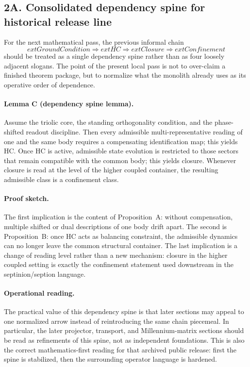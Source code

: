 \documentclass[12pt,a4paper]{article}
\DeclareRobustCommand{\QSCver}[1]{archival stage}
\renewcommand{\QSCver}[1]{historical release line}
\begin{document}
\subsection*{2A. Consolidated dependency spine for \QSCver{v2.27.0}}
For the next mathematical pass, the previous informal chain
\[
	ext{Ground Condition} \Longrightarrow ext{HC} \Longrightarrow ext{Closure} \Longrightarrow ext{Confinement}
\]
should be treated as a single dependency spine rather than as four loosely
adjacent slogans. The point of the present local pass is not to over-claim a
finished theorem package, but to normalize what the monolith already uses as
its operative order of dependence.

\paragraph{Lemma C (dependency spine lemma).}
Assume the triolic core, the standing orthogonality condition, and the
phase-shifted readout discipline. Then every admissible multi-representative
reading of one and the same body requires a compensating identification map;
this yields HC. Once HC is active, admissible state evolution is restricted to
those sectors that remain compatible with the common body; this yields closure.
Whenever closure is read at the level of the higher coupled container, the
resulting admissible class is a confinement class.

\paragraph{Proof sketch.}
The first implication is the content of Proposition~A: without compensation,
multiple shifted or dual descriptions of one body drift apart. The second is
Proposition~B: once HC acts as balancing constraint, the admissible dynamics can
no longer leave the common structural container. The last implication is a
change of reading level rather than a new mechanism: closure in the higher
coupled setting is exactly the confinement statement used downstream in the
septinion/seption language.

\paragraph{Operational reading.}
The practical value of this dependency spine is that later sections may appeal
to one normalized arrow instead of reintroducing the same chain piecemeal. In
particular, the later projector, transport, and Millennium-matrix sections
should be read as refinements of this spine, not as independent foundations.
This is also the correct mathematics-first reading for that archived public release:
first the spine is stabilized, then the surrounding operator language is
hardened.
\end{document}
